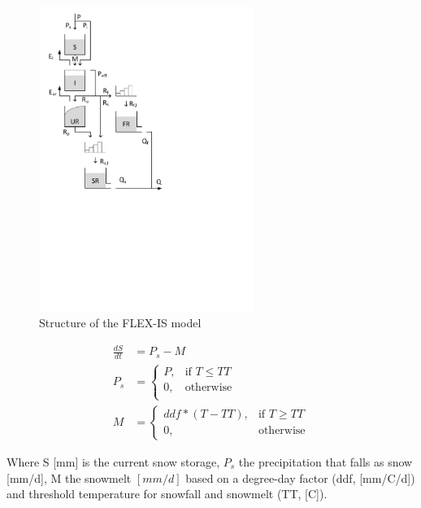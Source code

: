 { 																	%
\begin{figure}
\includegraphics[trim=1cm 12cm 7cm 1cm,width=7cm,keepaspectratio]{./files/34_schematic.pdf}
\caption{Structure of the FLEX-IS model} \label{fig:34_schematic}
\end{figure}

\begin{align}
	\frac{dS}{dt} &= P_s-M \\
	P_s &= \begin{cases}
		P, &\text{if } T \leq TT \\
		0, & \text{otherwise} \\
	\end{cases} \\
	M &= 
	\begin{cases}
		ddf*(T - TT), & \text{if } T \geq TT \\
		0, & \text{otherwise}
	\end{cases}
\end{align}

Where S [mm] is the current snow storage, $P_s$ the precipitation that falls as snow [mm/d], M the snowmelt $[mm/d]$ based on a degree-day factor (ddf, [mm/\degree C/d]) and threshold temperature for snowfall and snowmelt (TT, [\degree C]).


}
